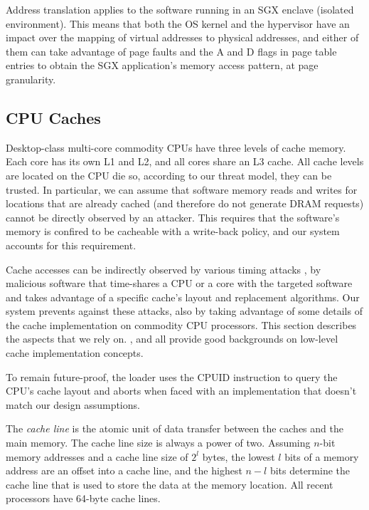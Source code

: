 Address translation applies to the software running in an SGX enclave
(isolated environment). This means that both the OS kernel and the hypervisor
have an impact over the mapping of virtual addresses to physical addresses, and
either of them can take advantage of page faults and the A and D flags in page
table entries to obtain the SGX application's memory access pattern, at page
granularity.


\subsection{CPU Caches}
\label{sec:caching}

Desktop-class multi-core commodity CPUs have three levels of cache memory. Each
core has its own L1 and L2, and all cores share an L3 cache. All cache levels
are located on the CPU die so, according to our threat model, they can be
trusted. In particular, we can assume that software memory reads and writes for
locations that are already cached (and therefore do not generate DRAM requests)
cannot be directly observed by an attacker. This requires that the software's
memory is confired to be cacheable with a write-back policy, and our system
accounts for this requirement.

Cache accesses can be indirectly observed by various timing attacks
\cite{banescu2011cache}, by malicious software that time-shares a CPU or a core
with the targeted software and takes advantage of a specific cache's layout
and replacement algorithms. Our system prevents against these attacks, also by
taking advantage of some details of the cache implementation on commodity CPU
processors. This section describes the aspects that we rely on.
\cite{smith1982cache}, \cite{patterson2013architecture} and
\cite{hennessy2012architecture} all provide good backgrounds on low-level cache
implementation concepts.

To remain future-proof, the loader uses the CPUID instruction
\cite{intel2013manual} to query the CPU's cache layout and aborts when faced
with an implementation that doesn't match our design assumptions.

The \textit{cache line} is the atomic unit of data transfer between the caches
and the main memory. The cache line size is always a power of two. Assuming
$n$-bit memory addresses and a cache line size of $2^{l}$ bytes, the lowest
$l$ bits of a memory address are an offset into a cache line, and the highest
$n - l$ bits determine the cache line that is used to store the data at the
memory location. All recent processors have 64-byte cache lines.

